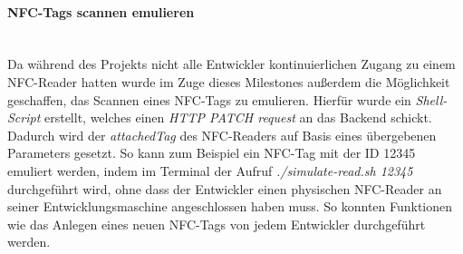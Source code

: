 \documentclass[10pt, a4paper]{article}
\begin{document}
\begin{onehalfspace}
\paragraph*{NFC-Tags scannen emulieren} $~$ \\
Da während des Projekts nicht alle Entwickler kontinuierlichen Zugang zu einem NFC-Reader hatten wurde im Zuge dieses Milestones außerdem die Möglichkeit
geschaffen, das Scannen eines NFC-Tags zu emulieren. Hierfür wurde ein \textit{Shell-Script} erstellt, welches einen \textit{HTTP PATCH request} an
das Backend schickt. Dadurch wird der \textit{attachedTag} des NFC-Readers auf Basis eines übergebenen Parameters gesetzt. So kann zum Beispiel ein NFC-Tag mit
der ID 12345 emuliert werden, indem im Terminal der Aufruf \textit{./simulate-read.sh 12345} durchgeführt wird, ohne dass der Entwickler einen physischen NFC-Reader
an seiner Entwicklungsmaschine angeschlossen haben muss. So konnten Funktionen wie das Anlegen eines neuen NFC-Tags von jedem Entwickler durchgeführt werden.



\end{onehalfspace}
\end{document}

